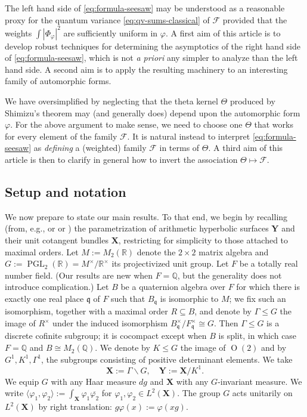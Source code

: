 \documentclass[reqno,10pt]{amsart}
\theoremstyle{plain} %
\theoremstyle{definition}
\theoremstyle{plain} %
\theoremstyle{remark}
\theoremstyle{itplain} %
\theoremstyle{remark} %
\renewcommand{\leq}{\leqslant}
\numberwithin{equation}{section}
\def\PGL{\operatorname{PGL}}
\def\O{\operatorname{O}}
\begin{document}
The left hand side of \eqref{eq:formula-seesaw} may be understood as a reasonable proxy for the quantum variance \eqref{eq:qv-sums-classical} of $\mathcal{F}$ provided that the weights $\int |\Phi_\varphi|^2$ are sufficiently uniform in $\varphi$.
A first aim of this article is to develop robust techniques for determining the asymptotics of the right hand side of \eqref{eq:formula-seesaw}, which is not \emph{a priori} any simpler to analyze than the left hand side.  A second aim is to apply the resulting machinery to an interesting family of automorphic forms.

We have oversimplified by neglecting that the theta kernel $\Theta$ produced by Shimizu's theorem may (and generally does) depend upon the automorphic form $\varphi$.  For the above argument to make sense, we need to choose one $\Theta$ that works for every element of the family $\mathcal{F}$.  It is natural instead to interpret \eqref{eq:formula-seesaw} as \emph{defining} a (weighted) family $\mathcal{F}$ in terms of $\Theta$.  A third aim of this article is then to clarify in general how to invert the association $\Theta \mapsto \mathcal{F}$.



\subsection{Setup and notation}\label{sec:intro-setup}
We now prepare to state our main results.  To that end, we begin by recalling (from, e.g., \cite[\S9]{MR0314766} or \cite[\S4]{MR580949} or \cite[\S38]{voightQA}) the parametrization of arithmetic hyperbolic surfaces $\mathbf{Y}$ and their unit cotangent bundles $\mathbf{X}$, restricting for simplicity to those attached to maximal orders.  Let $M := M_2(\mathbb{R})$ denote the $2 \times 2$ matrix algebra and $G := \PGL_2(\mathbb{R}) = M^\times / \mathbb{R}^\times$ its projectivized unit group.  Let $F$ be a totally real number field.  (Our results are new when $F = \mathbb{Q}$, but the generality does not introduce complication.)  Let $B$ be a quaternion algebra over $F$ for which there is exactly one real place $\mathfrak{q}$ of $F$ such that $B_{\mathfrak{q}}$ is isomorphic to $M$; we fix such an isomorphism, together with a maximal order $R \subseteq B$, and denote by $\Gamma \leq G$ the image of $R^\times$ under the induced isomorphism $B_{\mathfrak{q}}^\times / F_{\mathfrak{q}}^\times \cong G$.  Then $\Gamma \leq G$ is a discrete cofinite subgroup; it is cocompact except when $B$ is split, in which case $F = \mathbb{Q}$ and $B \cong M_2(\mathbb{Q})$.  We denote by $K \leq G$ the image of $\O(2)$ and by $G^1, K^1, \Gamma^1$, the subgroups consisting of positive determinant elements.  We take
\begin{equation*}
  \mathbf{X} := \Gamma \backslash G,
  \quad 
\mathbf{Y} := \mathbf{X} / K^1.
\end{equation*}
We equip $G$ with any Haar measure $d g$ and $\mathbf{X}$ with any $G$-invariant measure.  We write $\langle \varphi_1, \varphi_2 \rangle := \int_{\mathbf{X}} \varphi_1 \overline{\varphi_2}$ for $\varphi_1, \varphi_2 \in L^2(\mathbf{X})$.  The group $G$ acts unitarily on $L^2(\mathbf{X})$ by right translation: $g \varphi (x) := \varphi(x g)$.
\end{document}
